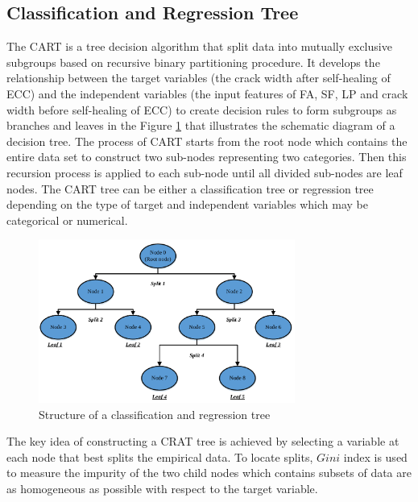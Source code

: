 \documentclass[11pt]{article}
\begin{document}
	
	
	\subsection{Classification and Regression Tree}
	
	The CART \cite{breiman2017classification}  is a tree decision algorithm that split data into mutually exclusive subgroups based on recursive binary partitioning procedure. It develops the relationship between the target variables (the crack width after self-healing of ECC) and the independent variables (the input features of FA, SF, LP and crack width before self-healing of ECC) to create decision rules to form subgroups as branches and leaves in the Figure \ref{fig:CART} that illustrates the schematic diagram of a decision tree. The process of CART starts from the root node which contains the entire data set to construct two sub-nodes representing two categories. Then this recursion process is applied to each sub-node until all divided sub-nodes are leaf nodes. The CART tree can be either a classification tree \cite{dan1995cart} or regression tree \cite{put2003classification} depending on the type of target and independent variables which may be categorical or numerical. 
	
	\begin{figure}[!htb]
		\begin{center}
			\includegraphics[width=0.75\textwidth]{CART}
		\end{center}
		\caption{Structure of a classification and regression tree \cite{put2003classification}}
		\label{fig:CART}
	\end{figure}
	
	
	The key idea of constructing a CRAT tree is achieved by selecting a variable at each node that best splits the empirical data. To locate splits, $Gini$ index is used to measure the impurity of the two child nodes which contains subsets of data are as homogeneous as possible with respect to the target variable.  
	
\end{document}
